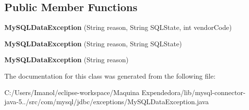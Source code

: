 \subsection*{Public Member Functions}
\begin{DoxyCompactItemize}
\item 
\mbox{\label{classcom_1_1mysql_1_1jdbc_1_1exceptions_1_1_my_s_q_l_data_exception_a22dff60942347a3d5002b740cd65647c}} 
{\bfseries My\+S\+Q\+L\+Data\+Exception} (String reason, String S\+Q\+L\+State, int vendor\+Code)
\item 
\mbox{\label{classcom_1_1mysql_1_1jdbc_1_1exceptions_1_1_my_s_q_l_data_exception_a52376500fe8365292972380092b2ef5a}} 
{\bfseries My\+S\+Q\+L\+Data\+Exception} (String reason, String S\+Q\+L\+State)
\item 
\mbox{\label{classcom_1_1mysql_1_1jdbc_1_1exceptions_1_1_my_s_q_l_data_exception_a764deaddb18c6fefbc70e88a52216dce}} 
{\bfseries My\+S\+Q\+L\+Data\+Exception} (String reason)
\end{DoxyCompactItemize}


The documentation for this class was generated from the following file\+:\begin{DoxyCompactItemize}
\item 
C\+:/\+Users/\+Imanol/eclipse-\/workspace/\+Maquina Expendedora/lib/mysql-\/connector-\/java-\/5../src/com/mysql/jdbc/exceptions/My\+S\+Q\+L\+Data\+Exception.\+java\end{DoxyCompactItemize}
